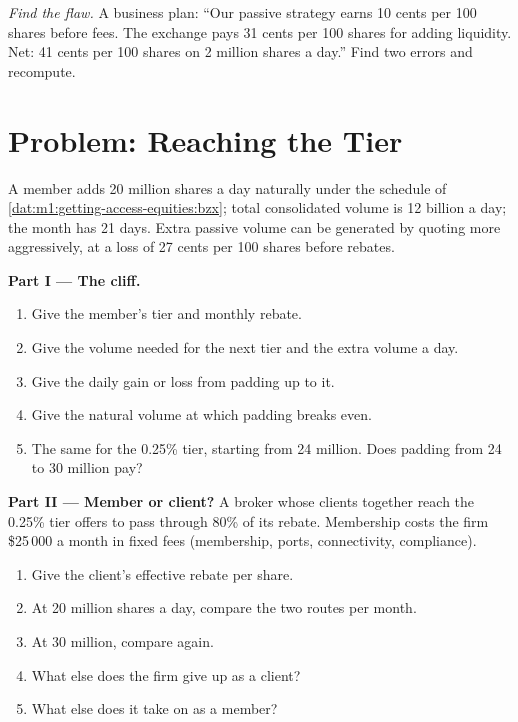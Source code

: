 \begin{exercise}[$\star\star\star$]\label{exo:m1:getting-access-equities:8}
\emph{Find the flaw.} A business plan: ``Our passive strategy earns 10 cents
per 100 shares before fees. The exchange pays 31 cents per 100 shares for
adding liquidity. Net: 41 cents per 100 shares on 2 million shares a day.''
Find two errors and recompute.
\end{exercise}

\section{Problem: Reaching the Tier}

\begin{problem}\label{pb:m1:getting-access-equities:1}
A member adds 20 million shares a day naturally under the schedule of
\cref{dat:m1:getting-access-equities:bzx}; total consolidated volume is 12
billion a day; the month has 21 days. Extra passive volume can be generated
by quoting more aggressively, at a loss of 27 cents per 100 shares before
rebates.

\medskip\noindent\textbf{Part I --- The cliff.}
\begin{enumerate}
\item Give the member's tier and monthly rebate.
\item Give the volume needed for the next tier and the extra volume a day.
\item Give the daily gain or loss from padding up to it.
\item Give the natural volume at which padding breaks even.
\item The same for the 0.25\% tier, starting from 24 million. Does padding from
24 to 30 million pay?
\end{enumerate}

\medskip\noindent\textbf{Part II --- Member or client?}
A broker whose clients together reach the 0.25\% tier offers to pass through
80\% of its rebate. Membership costs the firm \$25\,000 a month in fixed fees
(membership, ports, connectivity, compliance).
\begin{enumerate}[resume]
\item Give the client's effective rebate per share.
\item At 20 million shares a day, compare the two routes per month.
\item At 30 million, compare again.
\item What else does the firm give up as a client?
\item What else does it take on as a member?
\end{enumerate}


\end{problem}
